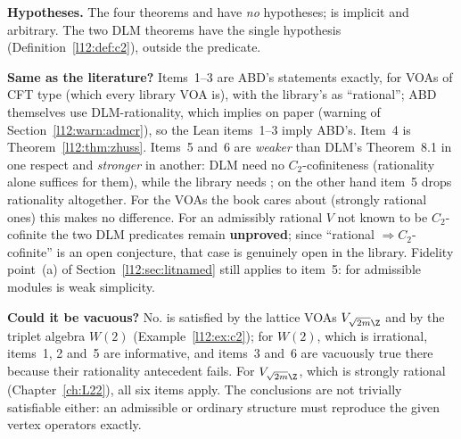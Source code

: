 \begin{dictionary}
\textbf{Hypotheses.} The four  theorems and  have \emph{no} hypotheses;  is
implicit and arbitrary. The two DLM theorems have the single hypothesis  (Definition~\ref{l12:def:c2}),
outside the predicate.

\textbf{Same as the literature?} Items~1--3 are ABD's statements exactly, for VOAs of CFT type (which every library VOA is),
with the library's  as ``rational''; ABD themselves use DLM-rationality, which implies
 on paper (warning of Section~\ref{l12:warn:admcr}), so the Lean items~1--3 imply ABD's. Item~4 is
Theorem~\ref{l12:thm:zhuss}. Items~5 and~6 are \emph{weaker} than DLM's Theorem~8.1 in one respect and \emph{stronger} in
another: DLM need no $C_2$-cofiniteness (rationality alone suffices for them), while the library needs ; on the other
hand item~5 drops rationality altogether. For the VOAs the book cares about (strongly rational ones) this makes no difference.
For an admissibly rational $V$ not known to be $C_2$-cofinite the two DLM predicates remain \textbf{unproved}; since
``rational $\Rightarrow C_2$-cofinite'' is an open conjecture, that case is genuinely open in the library. Fidelity point~(a)
of Section~\ref{l12:sec:litnamed} still applies to item~5:  for admissible modules is weak simplicity.

\textbf{Could it be vacuous?} No.  is satisfied by the lattice VOAs $V_{\sqrt{2m}\Z}$ and by the triplet
algebra $W(2)$ (Example~\ref{l12:ex:c2}); for $W(2)$, which is irrational, items~1, 2 and~5 are informative, and items~3
and~6 are vacuously true there because their rationality antecedent fails. For $V_{\sqrt{2m}\Z}$, which is strongly
rational (Chapter~\ref{ch:L22}), all six items apply. The conclusions are not trivially satisfiable either: an admissible
or ordinary structure must reproduce the given vertex operators exactly.
\end{dictionary}

